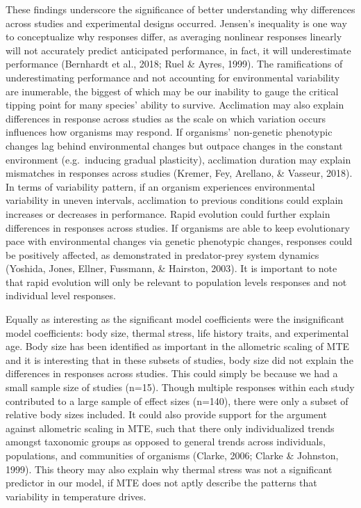 \documentclass[12pt,twoside]{reedthesis}
\begin{document}
These findings underscore the significance of better understanding why differences across studies and experimental designs occurred. Jensen's inequality is one way to conceptualize why responses differ, as averaging nonlinear responses linearly will not accurately predict anticipated performance, in fact, it will underestimate performance (Bernhardt et al., 2018; Ruel \& Ayres, 1999). The ramifications of underestimating performance and not accounting for environmental variability are inumerable, the biggest of which may be our inability to gauge the critical tipping point for many species' ability to survive. Acclimation may also explain differences in response across studies as the scale on which variation occurs influences how organisms may respond. If organisms' non-genetic phenotypic changes lag behind environmental changes but outpace changes in the constant environment (e.g.~inducing gradual plasticity), acclimation duration may explain mismatches in responses across studies (Kremer, Fey, Arellano, \& Vasseur, 2018). In terms of variability pattern, if an organism experiences environmental variability in uneven intervals, acclimation to previous conditions could explain increases or decreases in performance. Rapid evolution could further explain differences in responses across studies. If organisms are able to keep evolutionary pace with environmental changes via genetic phenotypic changes, responses could be positively affected, as demonstrated in predator-prey system dynamics (Yoshida, Jones, Ellner, Fussmann, \& Hairston, 2003). It is important to note that rapid evolution will only be relevant to population levels responses and not individual level responses.

Equally as interesting as the significant model coefficients were the insignificant model coefficients: body size, thermal stress, life history traits, and experimental age. Body size has been identified as important in the allometric scaling of MTE and it is interesting that in these subsets of studies, body size did not explain the differences in responses across studies. This could simply be because we had a small sample size of studies (n=15). Though multiple responses within each study contributed to a large sample of effect sizes (n=140), there were only a subset of relative body sizes included. It could also provide support for the argument against allometric scaling in MTE, such that there only individualized trends amongst taxonomic groups as opposed to general trends across individuals, populations, and communities of organisms (Clarke, 2006; Clarke \& Johnston, 1999). This theory may also explain why thermal stress was not a significant predictor in our model, if MTE does not aptly describe the patterns that variability in temperature drives.
\end{document}
